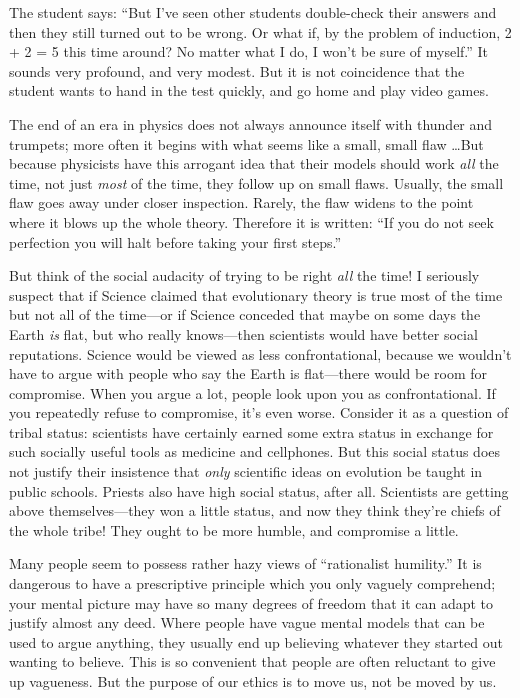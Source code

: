 {
 The student says: ``But I've seen
other students double-check their answers and then they still turned
out to be wrong. Or what if, by the problem of induction, 2 + 2 = 5
this time around? No matter what I do, I won't be sure
of myself.'' It sounds very profound, and very
modest. But it is not coincidence that the student wants to hand in the
test quickly, and go home and play video games.}

{
 The end of an era in physics does not always announce itself with
thunder and trumpets; more often it begins with what seems like a
small, small flaw \ldots But because physicists have this arrogant idea
that their models should work \textit{all} the time, not just
\textit{most} of the time, they follow up on small flaws. Usually, the
small flaw goes away under closer inspection. Rarely, the flaw widens
to the point where it blows up the whole theory. Therefore it is
written: ``If you do not seek perfection you will halt
before taking your first steps.''}

{
 But think of the social audacity of trying to be right
\textit{all} the time! I seriously suspect that if Science claimed that
evolutionary theory is true most of the time but not all of the
time---or if Science conceded that maybe on some days the Earth
\textit{is} flat, but who really knows---then scientists would have
better social reputations. Science would be viewed as less
confrontational, because we wouldn't have to argue with
people who say the Earth is flat---there would be room for compromise.
When you argue a lot, people look upon you as confrontational. If you
repeatedly refuse to compromise, it's even worse.
Consider it as a question of tribal status: scientists have certainly
earned some extra status in exchange for such socially useful tools as
medicine and cellphones. But this social status does not justify their
insistence that \textit{only} scientific ideas on evolution be taught
in public schools. Priests also have high social status, after all.
Scientists are getting above themselves---they won a little status, and
now they think they're chiefs of the whole tribe! They
ought to be more humble, and compromise a little.}

{
 Many people seem to possess rather hazy views of
``rationalist humility.'' It is
dangerous to have a prescriptive principle which you only vaguely
comprehend; your mental picture may have so many degrees of freedom
that it can adapt to justify almost any deed. Where people have vague
mental models that can be used to argue anything, they usually end up
believing whatever they started out wanting to believe. This is so
convenient that people are often reluctant to give up vagueness. But
the purpose of our ethics is to move us, not be moved by us.}

